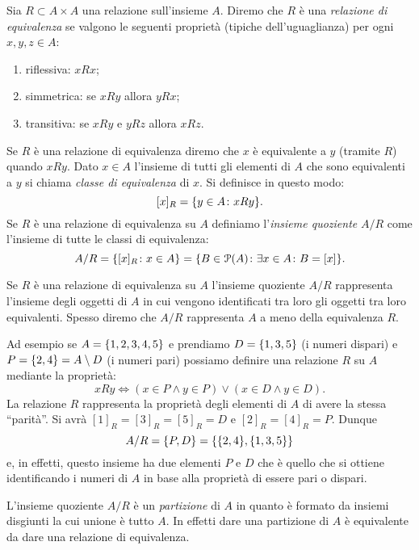\begin{definition}
\label{def:equivalenza}%
Sia $R\subset A\times A$ una relazione sull'insieme $A$. Diremo che 
$R$ è una \emph{relazione di equivalenza}%
%
 se valgono le seguenti proprietà
(tipiche dell'uguaglianza)
per ogni $x,y,z\in A$:
\begin{enumerate}
  \item riflessiva: $x R x$;
  \item simmetrica: se $x R y$ allora $y R x$;
  \item transitiva: se $x R y$ e $yRz$ allora $x R z$.
\end{enumerate}
Se $R$ è una relazione di equivalenza diremo che $x$ è equivalente a $y$ 
(tramite $R$) quando $xRy$.
Dato $x \in A$ l'insieme di tutti gli elementi di $A$ che sono equivalenti 
a $y$ si chiama \emph{classe di equivalenza}%
%
 di $x$. 
Si definisce in questo modo:
\[
  [x]_R = {\left\{ y\in A \colon xRy \right\}}.  
\]
Se $R$ è una relazione di equivalenza su $A$ definiamo 
l'\emph{insieme quoziente}%
%
%
$A/R$
come l'insieme di tutte le classi di equivalenza:
\[
 A/R 
 = {\left\{ [x]_R\colon x\in A \right\}} 
 = {\left\{ B\in \mathcal P(A)\colon \exists x\in A\colon B=[x] \right\}}.  
\]
\end{definition}

Se $R$ è una relazione di equivalenza su $A$ 
l'insieme quoziente $A/R$ rappresenta l'insieme 
degli oggetti di $A$ in cui vengono identificati tra loro gli oggetti tra loro 
equivalenti.
Spesso diremo che $A/R$ rappresenta $A$ a meno della equivalenza $R$.

Ad esempio se $A={\left\{ 1,2,3,4,5 \right\}}$ e prendiamo $D={\left\{ 1,3,5 \right\}}$ (i numeri dispari)
e $P={\left\{ 2,4 \right\}}=A\setminus D$ 
(i numeri pari) possiamo definire una relazione $R$ su $A$ mediante la proprietà:
\[
 x R  y \iff (x\in P \land y\in P) \lor (x\in D \land y\in D).
\]
La relazione $R$ rappresenta la proprietà degli elementi di $A$ 
di avere la stessa ``parità''. 
Si avrà $[1]_R = [3]_R=[5]_R= D$ e $[2]_R=[4]_R=P$.
Dunque 
\[
   A/R = {\left\{ P,D \right\}} = {\left\{ {\left\{ 2,4 \right\}},{\left\{ 1,3,5 \right\}} \right\}}
\]
e, in effetti, questo insieme ha due elementi $P$ e $D$ che è quello 
che si ottiene identificando i numeri di $A$ in base alla proprietà 
di essere pari o dispari. 

L'insieme quoziente $A/R$ è un \emph{partizione}%
%
 di $A$ in quanto 
è formato da insiemi disgiunti la cui unione è tutto $A$. In effetti 
dare una partizione di $A$ è equivalente da dare una relazione 
di equivalenza.

